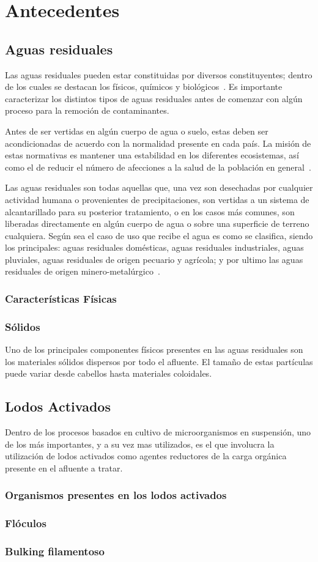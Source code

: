 \section{Antecedentes}
\subsection{Aguas residuales}
Las aguas residuales pueden estar constituidas por diversos constituyentes; dentro de los cuales se destacan los físicos, químicos y biológicos~\citep{crites2000}. Es importante caracterizar los distintos tipos de aguas residuales antes de comenzar con algún proceso para la remoción de contaminantes.\par
Antes de ser vertidas en algún cuerpo de agua o suelo, estas deben ser acondicionadas de acuerdo con la normalidad presente en cada país. La misión de estas normativas es mantener una estabilidad en los diferentes ecosistemas, así como el de reducir el número de afecciones a la salud de la población en general~\citep{lazcano2016}. \par
Las aguas residuales son todas aquellas que, una vez son desechadas por cualquier actividad humana o provenientes de precipitaciones, son vertidas a un sistema de alcantarillado para su posterior tratamiento, o en los casos más comunes, son liberadas directamente en algún cuerpo de agua o sobre una superficie de terreno cualquiera. Según sea el caso de uso que recibe el agua es como se clasifica, siendo los principales: aguas residuales domésticas, aguas residuales industriales, aguas pluviales, aguas residuales de origen pecuario y agrícola; y por ultimo las aguas residuales de origen minero-metalúrgico~\citep{lazcano2016,marcos2007}.
\subsubsection{Características Físicas}
\subsubsection*{Sólidos}
Uno de los principales componentes físicos presentes en las aguas residuales son los materiales sólidos dispersos por todo el afluente. El tamaño de estas partículas puede variar desde cabellos hasta materiales coloidales. 
\subsection{Lodos Activados}
Dentro de los procesos basados en cultivo de microorganismos en suspensión, uno de los más importantes, y a su vez mas utilizados, es el que involucra la utilización de lodos activados como agentes reductores de la carga orgánica presente en el afluente a tratar.
\subsubsection{Organismos presentes en los lodos activados}
\subsubsection{Flóculos}
\subsubsection{Bulking filamentoso}
